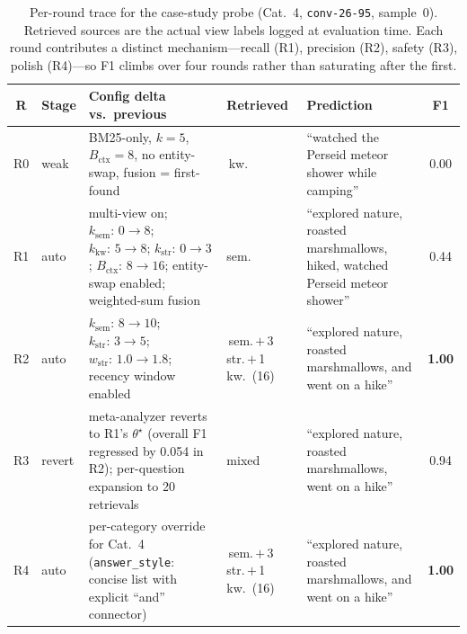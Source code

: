 \begin{table}[h]
\centering
\small
\caption{Per-round trace for the case-study probe (Cat.~4, \texttt{conv-26-95}, sample~0). Retrieved sources are the actual view labels logged at evaluation time. Each round contributes a distinct mechanism—recall (R1), precision (R2), safety (R3), polish (R4)—so F1 climbs over four rounds rather than saturating after the first.}
\label{tab:case_study_trace}
\vspace{0.5em}
\setlength{\tabcolsep}{4pt}
\begin{tabular}{@{}cl>{\raggedright\arraybackslash}p{3.6cm}>{\raggedright\arraybackslash}p{2.0cm}>{\raggedright\arraybackslash}p{4.1cm}c@{}}
\toprule
\textbf{R} & \textbf{Stage} & \textbf{Config delta vs.\ previous} & \textbf{Retrieved} & \textbf{Prediction} & \textbf{F1} \\
\midrule
R0 & weak  & BM25-only, $k{=}5$, $B_{\text{ctx}}{=}8$, no entity-swap, fusion = first-found
       & 5\,kw. & ``watched the Perseid meteor shower while camping'' & 0.00 \\
R1 & auto  & multi-view on; $k_{\text{sem}}{:}\,0\to8$; $k_{\text{kw}}{:}\,5\to8$; $k_{\text{str}}{:}\,0\to3$; $B_{\text{ctx}}{:}\,8\to16$; entity-swap enabled; weighted-sum fusion
       & 16 sem. & ``explored nature, roasted marshmallows, hiked, watched Perseid meteor shower'' & 0.44 \\
R2 & auto  & $k_{\text{sem}}{:}\,8\to10$; $k_{\text{str}}{:}\,3\to5$; $w_{\text{str}}{:}\,1.0\to1.8$; recency window enabled
       & 13\,sem.\,$+$\,3\,str.\,$+$\,1\,kw.\ (16) & ``explored nature, roasted marshmallows, and went on a hike'' & \textbf{1.00} \\
R3 & revert & meta-analyzer reverts to R1's $\theta^{\star}$ (overall F1 regressed by 0.054 in R2); per-question expansion to 20 retrievals
       & 20 mixed & ``explored nature, roasted marshmallows, went on a hike'' & 0.94 \\
R4 & auto  & per-category override for Cat.~4 (\texttt{answer\_style}: concise list with explicit ``and'' connector)
       & 13\,sem.\,$+$\,3\,str.\,$+$\,1\,kw.\ (16) & ``explored nature, roasted marshmallows, and went on a hike'' & \textbf{1.00} \\
\bottomrule
\end{tabular}
\end{table}

